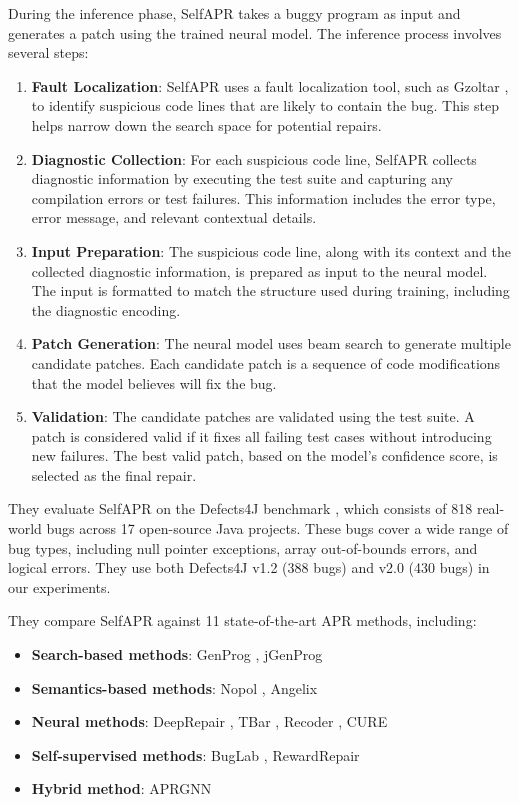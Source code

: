 \documentclass[manuscript,screen,review]{acmart}
\begin{document}
During the inference phase, SelfAPR takes a buggy program as input and generates a patch using the trained neural model. The inference process involves several steps:

\begin{enumerate}
\item \textbf{Fault Localization}: SelfAPR uses a fault localization tool, such as Gzoltar \cite{gzoltar}, to identify suspicious code lines that are likely to contain the bug. This step helps narrow down the search space for potential repairs.

\item \textbf{Diagnostic Collection}: For each suspicious code line, SelfAPR collects diagnostic information by executing the test suite and capturing any compilation errors or test failures. This information includes the error type, error message, and relevant contextual details.

\item \textbf{Input Preparation}: The suspicious code line, along with its context and the collected diagnostic information, is prepared as input to the neural model. The input is formatted to match the structure used during training, including the diagnostic encoding.

\item \textbf{Patch Generation}: The neural model uses beam search to generate multiple candidate patches. Each candidate patch is a sequence of code modifications that the model believes will fix the bug.

\item \textbf{Validation}: The candidate patches are validated using the test suite. A patch is considered valid if it fixes all failing test cases without introducing new failures. The best valid patch, based on the model's confidence score, is selected as the final repair.
\end{enumerate}

They evaluate SelfAPR on the Defects4J benchmark \cite{defects4j}, which consists of 818 real-world bugs across 17 open-source Java projects. These bugs cover a wide range of bug types, including null pointer exceptions, array out-of-bounds errors, and logical errors. They use both Defects4J v1.2 (388 bugs) and v2.0 (430 bugs) in our experiments.

They compare SelfAPR against 11 state-of-the-art APR methods, including:

\begin{itemize}
\item \textbf{Search-based methods}: GenProg \cite{genprog}, jGenProg \cite{jgenprog}
\item \textbf{Semantics-based methods}: Nopol \cite{nopol}, Angelix \cite{angelix}
\item \textbf{Neural methods}: DeepRepair \cite{deeprepair}, TBar \cite{tbar}, Recoder \cite{recoder}, CURE \cite{cure}
\item \textbf{Self-supervised methods}: BugLab \cite{buglab}, RewardRepair \cite{rewardrepair}
\item \textbf{Hybrid method}: APRGNN \cite{aprgnn}
\end{itemize}
\end{document}
